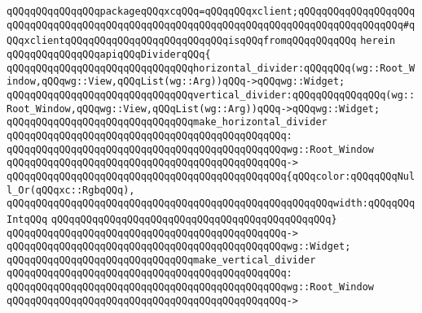 \verb|qQQqqQQqqQQqqQQqpackageqQQqxcqQQq=qQQqqQQqxclient;qQQqqQQqqQQqqQQqqQQqqQQqqQQqqQQqqQQqqQQqqQQqqQQqqQQqqQQqqQQqqQQqqQQqqQQqqQQqqQQqqQQqqQQq#qQQqxclientqQQqqQQqqQQqqQQqqQQqqQQqqQQqisqQQqfromqQQqqQQqqQQq|\newline
\verb|herein|\newline
\newline
\verb|qQQqqQQqqQQqqQQqapiqQQqDividerqQQq{|\newline
\newline
\newline
\verb|qQQqqQQqqQQqqQQqqQQqqQQqqQQqqQQqhorizontal_divider:qQQqqQQq(wg::Root_Window,qQQqwg::View,qQQqList(wg::Arg))qQQq->qQQqwg::Widget;|\newline
\verb|qQQqqQQqqQQqqQQqqQQqqQQqqQQqqQQqvertical_divider:qQQqqQQqqQQqqQQq(wg::Root_Window,qQQqwg::View,qQQqList(wg::Arg))qQQq->qQQqwg::Widget;|\newline
\newline
\verb|qQQqqQQqqQQqqQQqqQQqqQQqqQQqqQQqmake_horizontal_divider|\newline
\verb|qQQqqQQqqQQqqQQqqQQqqQQqqQQqqQQqqQQqqQQqqQQqqQQq:|\newline
\verb|qQQqqQQqqQQqqQQqqQQqqQQqqQQqqQQqqQQqqQQqqQQqqQQqwg::Root_Window|\newline
\verb|qQQqqQQqqQQqqQQqqQQqqQQqqQQqqQQqqQQqqQQqqQQqqQQq->|\newline
\verb|qQQqqQQqqQQqqQQqqQQqqQQqqQQqqQQqqQQqqQQqqQQqqQQq{qQQqcolor:qQQqqQQqNull_Or(qQQqxc::RgbqQQq),|\newline
\verb|qQQqqQQqqQQqqQQqqQQqqQQqqQQqqQQqqQQqqQQqqQQqqQQqqQQqqQQqwidth:qQQqqQQqIntqQQq|\newline
\verb|qQQqqQQqqQQqqQQqqQQqqQQqqQQqqQQqqQQqqQQqqQQqqQQq}|\newline
\verb|qQQqqQQqqQQqqQQqqQQqqQQqqQQqqQQqqQQqqQQqqQQqqQQq->|\newline
\verb|qQQqqQQqqQQqqQQqqQQqqQQqqQQqqQQqqQQqqQQqqQQqqQQqwg::Widget;|\newline
\newline
\verb|qQQqqQQqqQQqqQQqqQQqqQQqqQQqqQQqmake_vertical_divider|\newline
\verb|qQQqqQQqqQQqqQQqqQQqqQQqqQQqqQQqqQQqqQQqqQQqqQQq:|\newline
\verb|qQQqqQQqqQQqqQQqqQQqqQQqqQQqqQQqqQQqqQQqqQQqqQQqwg::Root_Window|\newline
\verb|qQQqqQQqqQQqqQQqqQQqqQQqqQQqqQQqqQQqqQQqqQQqqQQq->|\newline
